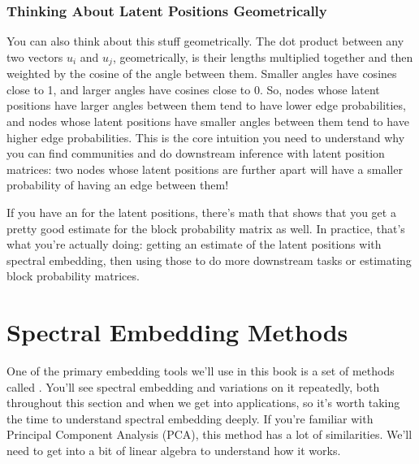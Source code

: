 \documentclass[letterpaper,10pt,english]{jupyterBook}
\begin{document}
\noindent{}


\subsubsection{Thinking About Latent Positions Geometrically}
\label{\detokenize{representations/ch6/why-embed-networks:thinking-about-latent-positions-geometrically}}
\sphinxAtStartPar
You can also think about this stuff geometrically. The dot product between any two vectors \(u_i\) and \(u_j\), geometrically, is their lengths multiplied together and then weighted by the cosine of the angle between them. Smaller angles have cosines close to 1, and larger angles have cosines close to 0. So, nodes whose latent positions have larger angles between them tend to have lower edge probabilities, and nodes whose latent positions have smaller angles between them tend to have higher edge probabilities. This is the core intuition you need to understand why you can find communities and do downstream inference with latent position matrices: two nodes whose latent positions are further apart will have a smaller probability of having an edge between them!

\noindent{}

\sphinxAtStartPar
If you have an  for the latent positions, there’s math that shows that you get a pretty good estimate for the block probability matrix as well. In practice, that’s what you’re actually doing: getting an estimate of the latent positions with spectral embedding, then using those to do more downstream tasks or estimating block probability matrices.


\section{Spectral Embedding Methods}
\label{\detokenize{representations/ch6/spectral-embedding:spectral-embedding-methods}}\label{\detokenize{representations/ch6/spectral-embedding::doc}}
\sphinxAtStartPar
One of the primary embedding tools we’ll use in this book is a set of methods called  . You’ll see spectral embedding and variations on it repeatedly, both throughout this section and when we get into applications, so it’s worth taking the time to understand spectral embedding deeply. If you’re familiar with Principal Component Analysis (PCA), this method has a lot of similarities. We’ll need to get into a bit of linear algebra to understand how it works.
\end{document}
